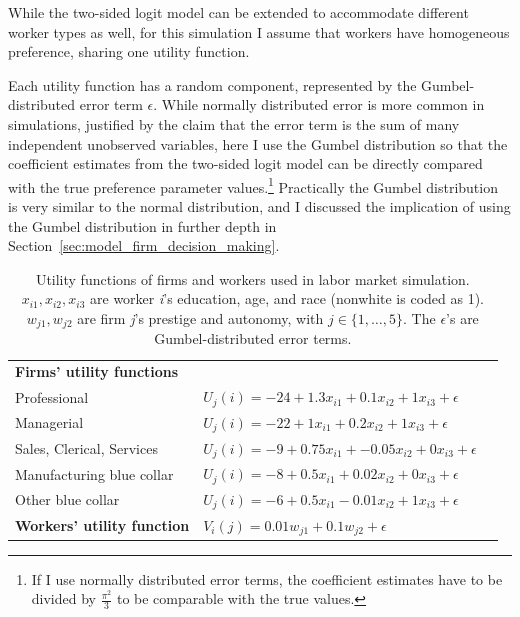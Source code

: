 While the two-sided logit model can be extended to accommodate different worker types as well, for
this simulation I assume that workers have homogeneous preference, sharing one
utility function.

Each utility function has a random component, represented by the
Gumbel-distributed error term $\epsilon$. While normally distributed error is
more common in simulations, justified by the claim that the error term is
the sum of many independent unobserved variables, here I use the Gumbel
distribution so that the coefficient estimates from the two-sided logit model can be
directly compared with the true preference parameter values.\footnote{If I use
  normally distributed error terms, the coefficient estimates have to be divided
by $\frac{\pi^2}{3}$ to be comparable with the true values.} Practically the
Gumbel distribution is very similar to the normal distribution, and I discussed
the implication of using the Gumbel distribution in further depth in Section~\ref{sec:model_firm_decision_making}.

\begin{table}[!ht]
\centering
\caption[Utility functions used in labor market simulations.]{Utility functions
  of firms and workers used in labor market simulation. $x_{i1}, x_{i2}, x_{i3}$ are worker \textit{i}'s education, age, and race (nonwhite is coded as 1). $w_{j1}, w_{j2}$ are firm \textit{j}'s prestige and autonomy, with $j \in \{1, \dots, 5\}$. The $\epsilon$'s are Gumbel-distributed error terms.}
\label{tab:sim_labor_nojobs_utility_functions}
\begin{tabular}{lll}
\\[-1.8ex]\hline 
\textbf{Firms' utility functions}  &                                                                                     \\
Professional                         & $U_{j}(i) = -24 + 1.3 x_{i1} + 0.1 x_{i2} + 1 x_{i3} + \epsilon$         \\
Managerial                           & $U_{j}(i) = -22 + 1 x_{i1} + 0.2 x_{i2} + 1 x_{i3} + \epsilon$     \\
Sales, Clerical, Services            & $U_{j}(i) = -9 + 0.75 x_{i1} + -0.05 x_{i2} + 0 x_{i3} + \epsilon$ \\
Manufacturing blue collar            & $U_{j}(i) = -8 + 0.5 x_{i1} + 0.02 x_{i2} + 0 x_{i3} + \epsilon$   \\
Other blue collar                    & $U_{j}(i) = -6 + 0.5 x_{i1} - 0.01 x_{i2} + 1 x_{i3} + \epsilon$   \\
  \hline
\textbf{Workers' utility function} & $V_{i}(j) = 0.01 w_{j1} + 0.1 w_{j2} + \epsilon$                   \\
  \hline
\end{tabular}
\end{table}


